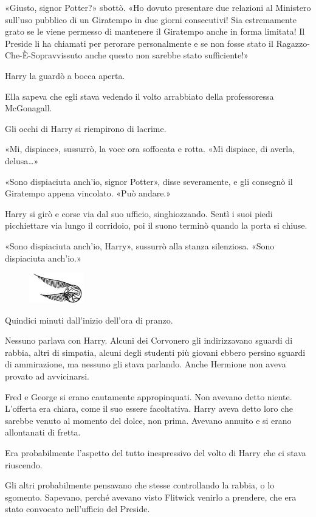 «Giusto, signor Potter?» sbottò. «Ho dovuto presentare due relazioni al Ministero sull’uso pubblico di un Giratempo in due giorni consecutivi! Sia estremamente grato se le viene permesso di mantenere il Giratempo anche in forma limitata! Il Preside li ha chiamati per perorare personalmente e se non fosse stato il Ragazzo-Che-È-Sopravvissuto anche questo non sarebbe stato sufficiente!»

Harry la guardò a bocca aperta.

Ella sapeva che egli stava vedendo il volto arrabbiato della professoressa McGonagall.

Gli occhi di Harry si riempirono di lacrime.

«Mi, dispiace», sussurrò, la voce ora soffocata e rotta. «Mi dispiace, di averla, delusa…»

«Sono dispiaciuta anch’io, signor Potter», disse severamente, e gli consegnò il Giratempo appena vincolato. «Può andare.»

Harry si girò e corse via dal suo ufficio, singhiozzando. Sentì i suoi piedi picchiettare via lungo il corridoio, poi il suono terminò quando la porta si chiuse.

«Sono dispiaciuta anch’io, Harry», sussurrò alla stanza silenziosa. «Sono dispiaciuta anch’io.»

\begin{figure}[h!]
        \includegraphics[scale=0.4]{boccino.png}
        \centering
\end{figure}

Quindici minuti dall’inizio dell’ora di pranzo.

Nessuno parlava con Harry. Alcuni dei Corvonero gli indirizzavano sguardi di rabbia, altri di simpatia, alcuni degli studenti più giovani ebbero persino sguardi di ammirazione, ma nessuno gli stava parlando. Anche Hermione non aveva provato ad avvicinarsi.

Fred e George si erano cautamente appropinquati. Non avevano detto niente. L’offerta era chiara, come il suo essere facoltativa. Harry aveva detto loro che sarebbe venuto al momento del dolce, non prima. Avevano annuito e si erano allontanati di fretta.

Era probabilmente l’aspetto del tutto inespressivo del volto di Harry che ci stava riuscendo.

Gli altri probabilmente pensavano che stesse controllando la rabbia, o lo sgomento. Sapevano, perché avevano visto Flitwick venirlo a prendere, che era stato convocato nell’ufficio del Preside.

